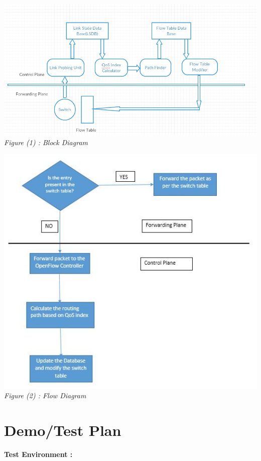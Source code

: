 \documentclass[12pt]{extarticle}
\begin{document}
\newpage
\begin{center}
\vspace*{\fill}
\includegraphics[width=\textwidth]{Block_diagram}
\textit{Figure (1) : Block Diagram}
\end{center}
\vspace*{\fill}

\newpage
\begin{center}
\vspace*{\fill}
\includegraphics[width=\textwidth]{flow_diagram}
\center \textit{Figure (2) : Flow Diagram}
\vspace*{\fill}
\end{center}

\newpage
\vspace{4mm}
\section*{Demo/Test Plan}
{\large \textbf{Test Environment :} }\\
\end{document}
